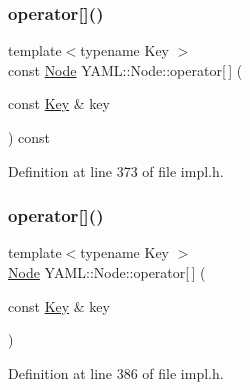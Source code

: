 \subsubsection{\texorpdfstring{operator[]()}{operator[]()}\hspace{0.1cm}{\footnotesize\ttfamily [1/4]}}
{\footnotesize\ttfamily template$<$typename Key $>$ \\
const \mbox{\hyperlink{class_y_a_m_l_1_1_node}{Node}} Y\+A\+M\+L\+::\+Node\+::operator\mbox{[}$\,$\mbox{]} (\begin{DoxyParamCaption}\item[{const \mbox{\hyperlink{namespace_y_a_m_l_a67c320aa50d3de7ecba1d0b8775dd684a1af533fc24b0311b8c4d5ac2870283aa}{Key}} \&}]{key }\end{DoxyParamCaption}) const\hspace{0.3cm}{\ttfamily [inline]}}



Definition at line 373 of file impl.\+h.

\mbox{\label{class_y_a_m_l_1_1_node_af2123f5a45029366e0fa6fb75e13d1f4}} 
\subsubsection{\texorpdfstring{operator[]()}{operator[]()}\hspace{0.1cm}{\footnotesize\ttfamily [2/4]}}
{\footnotesize\ttfamily template$<$typename Key $>$ \\
\mbox{\hyperlink{class_y_a_m_l_1_1_node}{Node}} Y\+A\+M\+L\+::\+Node\+::operator\mbox{[}$\,$\mbox{]} (\begin{DoxyParamCaption}\item[{const \mbox{\hyperlink{namespace_y_a_m_l_a67c320aa50d3de7ecba1d0b8775dd684a1af533fc24b0311b8c4d5ac2870283aa}{Key}} \&}]{key }\end{DoxyParamCaption})\hspace{0.3cm}{\ttfamily [inline]}}



Definition at line 386 of file impl.\+h.

\mbox{\label{class_y_a_m_l_1_1_node_a61d3f1d940f690d6ba06df7fef53510b}} 
